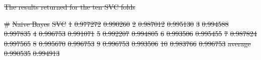 \documentclass[
10pt, %
a4paper, %
oneside, %
headinclude,footinclude, %
] {book}%
\providecommand{\DIFdel}[1]{{\protect\color{red}\sout{#1}}}                      %
\providecommand{\DIFaddend}{} %
\providecommand{\DIFdelFL}[1]{\DIFdel{#1}} %
\providecommand{\DIFaddbeginFL}{} %
\providecommand{\DIFdelbeginFL}{} %
\providecommand{\DIFdelendFL}{} %
\begin{document}
\begin{table}[H]
\begin{tabular}{lllll}
    \end{tabular}
  \DIFdelbeginFL %
{%
\DIFdelFL{The results returned for the ten SVC folds}}
\DIFdelendFL 

\DIFdelbeginFL %
\DIFdelFL{\# }%
\DIFdelFL{Naive Bayes }%
\DIFdelFL{SVC }%
\DIFdelFL{1 }%
\DIFdelFL{0.977272 }%
\DIFdelFL{0.990260 }%
\DIFdelFL{2 }%
\DIFdelFL{0.987012 }%
\DIFdelFL{0.995130 }%
\DIFdelFL{3 }%
\DIFdelFL{0.994588 }%
\DIFdelFL{0.997835 }%
\DIFdelFL{4 }%
\DIFdelFL{0.996753 }%
\DIFdelFL{0.991071 }%
\DIFdelFL{5 }%
\DIFdelFL{0.992207 }%
\DIFdelFL{0.994805 }%
\DIFdelFL{6 }%
\DIFdelFL{0.993506 }%
\DIFdelFL{0.995455 }%
\DIFdelFL{7 }%
\DIFdelFL{0.987824 }%
\DIFdelFL{0.997565 }%
\DIFdelFL{8 }%
\DIFdelFL{0.995670 }%
\DIFdelFL{0.996753 }%
\DIFdelFL{9 }%
\DIFdelFL{0.996753 }%
\DIFdelFL{0.993506 }%
\DIFdelFL{10 }%
\DIFdelFL{0.983766 }%
\DIFdelFL{0.996753 }%
\DIFdelFL{average }%
\DIFdelFL{0.990535 }%
\DIFdelFL{0.994913
}\DIFdelendFL \DIFaddbeginFL \end{table}
\DIFaddend 
\end{document}
